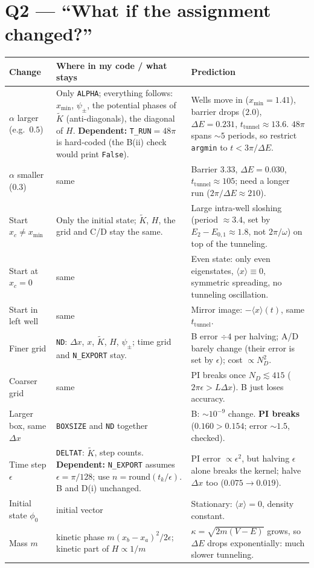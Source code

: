 \documentclass[10pt]{article}
\newcommand{\code}[1]{\texttt{#1}}
\begin{document}
\section{Q2 --- ``What if the assignment changed?''}
{\small
\begin{tabularx}{\linewidth}{@{}>{\raggedright\arraybackslash}p{2.3cm}>{\raggedright\arraybackslash}X>{\raggedright\arraybackslash}X@{}}
\toprule
\textbf{Change} & \textbf{Where in my code / what stays} & \textbf{Prediction}\\
\midrule
$\alpha$ larger (e.g.\ $0.5$) & Only \code{ALPHA}; everything follows: $x_{\min}$, $\psi_\pm$, the potential phases of $\tilde K$ (anti-diagonals), the diagonal of $H$. \textbf{Dependent:} \code{T\_RUN}${}=48\pi$ is hard-coded (the B(ii) check would print \code{False}). & Wells move in ($x_{\min}=1.41$), barrier drops ($2.0$), $\Delta E=0.231$, $t_\text{tunnel}\approx13.6$. $48\pi$ spans $\sim5$ periods, so restrict \code{argmin} to $t<3\pi/\Delta E$.\\
$\alpha$ smaller ($0.3$) & same & Barrier $3.33$, $\Delta E=0.030$, $t_\text{tunnel}\approx105$; need a longer run ($2\pi/\Delta E\approx210$).\\
Start $x_c\neq x_{\min}$ & Only the initial state; $\tilde K$, $H$, the grid and C/D stay the same. & Large intra-well sloshing (period $\approx3.4$, set by $E_2-E_{0,1}\approx1.8$, not $2\pi/\omega$) on top of the tunneling.\\
Start at $x_c=0$ & same & Even state: only even eigenstates, $\langle x\rangle\equiv0$, symmetric spreading, no tunneling oscillation.\\
Start in left well & same & Mirror image: $-\langle x\rangle(t)$, same $t_\text{tunnel}$.\\
Finer grid & \code{ND}: $\Delta x$, $x$, $\tilde K$, $H$, $\psi_\pm$; time grid and \code{N\_EXPORT} stay. & B error $\div4$ per halving; A/D barely change (their error is set by $\epsilon$); cost $\propto N_D^2$.\\
Coarser grid & same & PI breaks once $N_D\lesssim415$ ($2\pi\epsilon>L\Delta x$). B just loses accuracy.\\
Larger box, same $\Delta x$ & \code{BOXSIZE} and \code{ND} together & B: $\sim10^{-9}$ change. \textbf{PI breaks} ($0.160>0.154$; error $\sim1.5$, checked).\\
Time step $\epsilon$ & \code{DELTAT}: $\tilde K$, step counts. \textbf{Dependent:} \code{N\_EXPORT} assumes $\epsilon=\pi/128$; use $n=\mathrm{round}(t_k/\epsilon)$. B and D(i) unchanged. & PI error $\propto\epsilon^2$, but halving $\epsilon$ alone breaks the kernel; halve $\Delta x$ too ($0.075\to0.019$).\\
Initial state $\phi_0$ & initial vector & Stationary: $\langle x\rangle=0$, density constant.\\
Mass $m$ & kinetic phase $m(x_b-x_a)^2/2\epsilon$; kinetic part of $H\propto1/m$ & $\kappa=\sqrt{2m(V-E)}$ grows, so $\Delta E$ drops exponentially: much slower tunneling.\\
\bottomrule
\end{tabularx}}
\end{document}
